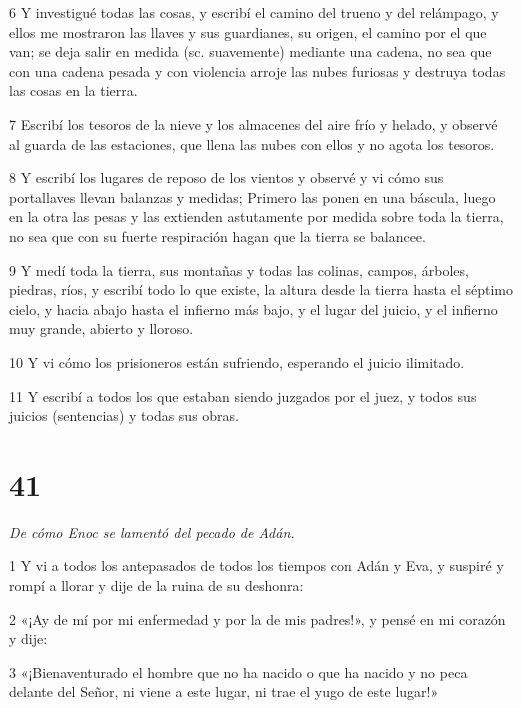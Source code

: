 \par 6 Y investigué todas las cosas, y escribí el camino del trueno y del relámpago, y ellos me mostraron las llaves y sus guardianes, su origen, el camino por el que van; se deja salir en medida (sc. suavemente) mediante una cadena, no sea que con una cadena pesada y con violencia arroje las nubes furiosas y destruya todas las cosas en la tierra.

\par 7 Escribí los tesoros de la nieve y los almacenes del aire frío y helado, y observé al guarda de las estaciones, que llena las nubes con ellos y no agota los tesoros.

\par 8 Y escribí los lugares de reposo de los vientos y observé y vi cómo sus portallaves llevan balanzas y medidas; Primero las ponen en una báscula, luego en la otra las pesas y las extienden astutamente por medida sobre toda la tierra, no sea que con su fuerte respiración hagan que la tierra se balancee.

\par 9 Y medí toda la tierra, sus montañas y todas las colinas, campos, árboles, piedras, ríos, y escribí todo lo que existe, la altura desde la tierra hasta el séptimo cielo, y hacia abajo hasta el infierno más bajo, y el lugar del juicio, y el infierno muy grande, abierto y lloroso.

\par 10 Y vi cómo los prisioneros están sufriendo, esperando el juicio ilimitado.

\par 11 Y escribí a todos los que estaban siendo juzgados por el juez, y todos sus juicios (sentencias) y todas sus obras.

\chapter{41}

\par \textit{De cómo Enoc se lamentó del pecado de Adán.}

\par 1 Y vi a todos los antepasados ​​de todos los tiempos con Adán y Eva, y suspiré y rompí a llorar y dije de la ruina de su deshonra:

\par 2 «¡Ay de mí por mi enfermedad y por la de mis padres!», y pensé en mi corazón y dije:

\par 3 «¡Bienaventurado el hombre que no ha nacido o que ha nacido y no peca delante del Señor, ni viene a este lugar, ni trae el yugo de este lugar!»

